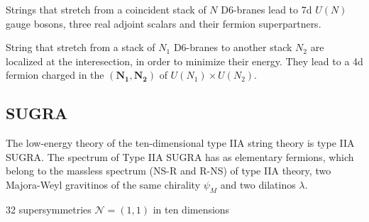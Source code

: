 Strings that stretch from a coincident stack of $N$ D6-branes lead to 7d $U(N)$ gauge bosons, three real adjoint scalars and their fermion superpartners.

String that stretch from a stack of $N_1$ D6-branes to another stack $N_2$ are localized at the interesection,
in order to minimize their energy. 
They lead to a 4d fermion charged in the $(\mathbf{N_1},\mathbf{N_2})$ of $U(N_1)\times U(N_2)$.


%


\subsection{SUGRA}
 
The low-energy theory of the ten-dimensional type IIA string theory is type IIA SUGRA.
The spectrum of Type IIA SUGRA has as elementary fermions, which belong to the massless spectrum (NS-R and R-NS) of type IIA theory,
two Majora-Weyl gravitinos of the same chirality $\psi_M$ and two dilatinos $\lambda$. 

32 supersymmetries $\mathcal N=(1,1)$ in ten dimensions

